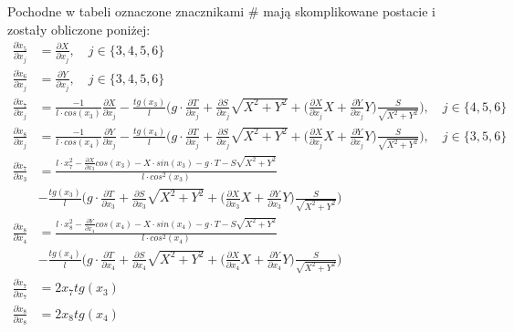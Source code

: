 \documentclass[10pt]{article}
\begin{document}
Pochodne w tabeli oznaczone znacznikami \# mają skomplikowane postacie i zostały obliczone poniżej:
\begin{equation}
\begin{split}
\frac{ \partial \dot{x}_5 }{ \partial x_j } &= \frac{ \partial X }{ \partial x_j }, \quad j \in \{ 3, 4, 5, 6 \} \\
\frac{ \partial \dot{x}_6 }{ \partial x_j } &= \frac{ \partial Y }{ \partial x_j }, \quad j \in \{ 3, 4, 5, 6 \} \\
\frac{ \partial \dot{x}_7 }{ \partial x_j } &= 
\frac{-1}{l \cdot cos(x_3)} \frac{\partial X}{\partial x_j} - \frac{tg(x_3)}{l} \bigg(
g \cdot \frac{\partial T}{\partial x_j} +
\frac{\partial S}{\partial x_j}\sqrt{X^2 + Y^2} +
\Big( \frac{\partial X}{\partial x_j}X + \frac{\partial Y}{\partial x_j}Y \Big) \frac{S}{\sqrt{X^2 + Y^2}} \bigg), \quad j \in \{ 4, 5, 6 \} \\
\frac{ \partial \dot{x}_8 }{ \partial x_j } &=
\frac{-1}{l \cdot cos(x_4)} \frac{\partial Y}{\partial x_j} - \frac{tg(x_4)}{l} \bigg(
g \cdot \frac{\partial T}{\partial x_j} +
\frac{\partial S}{\partial x_j}\sqrt{X^2 + Y^2} +
\Big( \frac{\partial X}{\partial x_j}X + \frac{\partial Y}{\partial x_j}Y \Big) \frac{S}{\sqrt{X^2 + Y^2}} \bigg), \quad j \in \{ 3, 5, 6 \} \\
\frac{ \partial \dot{x}_7 }{ \partial x_3 } &= \frac{l \cdot x_7^2 - \frac{\partial X}{\partial x_3} cos(x_3) -
X \cdot sin(x_3) - g \cdot T - S \sqrt{X^2 + Y^2}}{l \cdot cos^2 (x_3)} \\
&- \frac{tg(x_3)}{l} \bigg(g \cdot \frac{\partial T}{\partial x_3} + \frac{\partial S}{\partial x_3}\sqrt{X^2 + Y^2} +
\Big( \frac{\partial X}{\partial x_3}X + \frac{\partial Y}{\partial x_3}Y \Big) \frac{S}{\sqrt{X^2 + Y^2}} \bigg)  \\
\frac{ \partial \dot{x}_8 }{ \partial x_4 } &= \frac{l \cdot x_8^2 - \frac{\partial Y}{\partial x_4} cos(x_4) -
X \cdot sin(x_4) - g \cdot T - S \sqrt{X^2 + Y^2}}{l \cdot cos^2 (x_4)} \\
&- \frac{tg(x_4)}{l} \bigg(g \cdot \frac{\partial T}{\partial x_4} + \frac{\partial S}{\partial x_4}\sqrt{X^2 + Y^2} +
\Big( \frac{\partial X}{\partial x_4}X + \frac{\partial Y}{\partial x_4}Y \Big) \frac{S}{\sqrt{X^2 + Y^2}} \bigg) \\
\frac{ \partial \dot{x}_7 }{ \partial x_7 } &= 2x_7 tg(x_3) \\
\frac{ \partial \dot{x}_8 }{ \partial x_8 } &= 2x_8 tg(x_4) \\
\end{split}
\end{equation}
\end{document}

